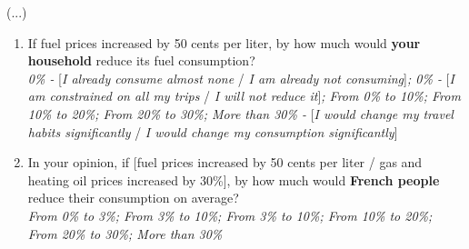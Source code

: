 \documentclass[english,5p,authoryear]{elsarticle}
\begin{document}
\begin{appendices}
(...)\textit{}
\begin{enumerate}[resume,leftmargin=*]
\item If fuel prices increased by 50 cents per liter, by how much would
\textbf{\textbf{your household}} reduce its fuel consumption? \textit{}\\
\textit{0\% -} {[}\textit{I already consume almost none }/\textit{ I am
already not consuming}{]}\textit{; 0\% - }{[}\textit{I am constrained
on all my trips} / \textit{I will not reduce it}{]}\textit{; From 0\%
to 10\%; From 10\% to 20\%; From 20\% to 30\%; More than 30\% - }{[}\textit{I
would change my travel habits significantly }/ \textit{I would change
my consumption significantly}{]}
\item In your opinion, if {[}fuel prices increased by 50 cents per liter
/ gas and heating oil prices increased by 30\%{]}, by how much would
\textbf{\textbf{French people}} reduce their consumption on average?
\textit{}\\
\textit{From 0\% to 3\%; From 3\% to 10\%; From 3\% to 10\%; From 10\%
to 20\%; From 20\% to 30\%; More than 30\%} 
\end{enumerate}


\end{appendices}
\end{document}
